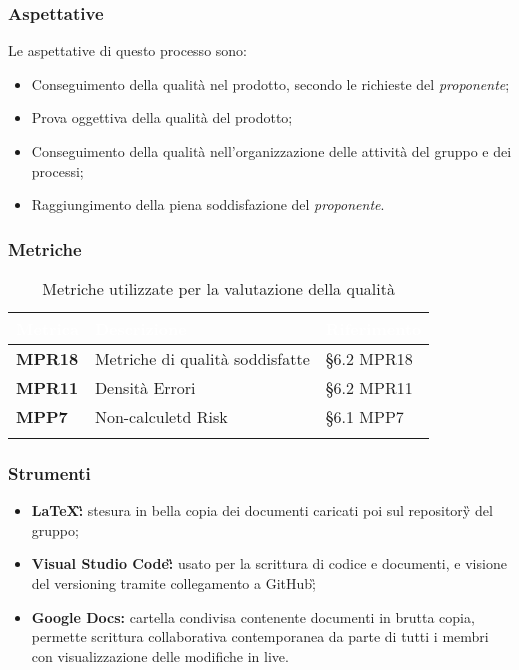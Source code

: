 			\subsubsection{Aspettative}
				 Le aspettative di questo processo sono:
					\begin{itemize}
						\item Conseguimento della qualità nel prodotto, secondo le richieste del \emph{proponente};
						\item Prova oggettiva della qualità del prodotto;						
						\item Conseguimento della qualità nell'organizzazione delle attività del gruppo e dei processi;
						\item Raggiungimento della piena soddisfazione del \emph{proponente}.
					\end{itemize}

			\subsubsection{Metriche}
			\setlength{\freewidth}{\dimexpr\textwidth-0\tabcolsep}
			\renewcommand{\arraystretch}{1.5}
			\setlength{\aboverulesep}{0pt}
			\setlength{\belowrulesep}{0pt}
			\begin{longtable}{L{.22\freewidth} L{.4\freewidth} L{.2\freewidth}}
				\toprule
				\textcolor{white}{\textbf{Metrica}}&
				\textcolor{white}{\textbf{Descrizione}}&	
				\textcolor{white}{\textbf{Riferimento}}\\
				\toprule
				\endhead
				
				\textbf{MPR18} & Metriche di qualità soddisfatte & \S 6.2 MPR18 \\
				\textbf{MPR11} & Densità Errori & \S 6.2 MPR11 \\
				\textbf{MPP7} & Non-calculetd Risk & \S 6.1 MPP7 \\

				\bottomrule
				\caption{Metriche utilizzate per la valutazione della qualità}
			\end{longtable}
			
			\subsubsection{Strumenti}
			\begin{itemize}
				\item \textbf{LaTeX\G:} stesura in bella copia dei documenti caricati poi sul repository\G{} del gruppo;
				\item \textbf{Visual Studio Code\G:} usato per la scrittura di codice e documenti, e visione del versioning tramite collegamento a GitHub\G;
				\item \textbf{Google Docs:} cartella condivisa contenente documenti in brutta copia, permette scrittura collaborativa contemporanea da parte di tutti i membri con visualizzazione delle modifiche in live.
			\end{itemize}

